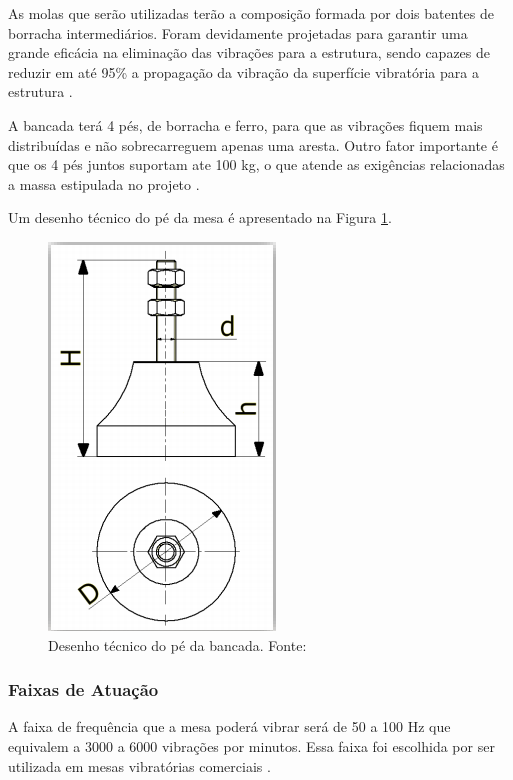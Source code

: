   As molas que serão utilizadas terão a composição formada por dois batentes de borracha intermediários. Foram devidamente projetadas para garantir uma grande eficácia na eliminação das vibrações para a estrutura, sendo capazes de reduzir em até 95\% a propagação da vibração da superfície vibratória para a estrutura \cite{mola_catalogo}.

    A bancada terá 4 pés, de borracha e ferro, para que as vibrações fiquem mais distribuídas e não sobrecarreguem apenas uma aresta. Outro fator importante é que os 4 pés juntos suportam ate 100 kg, o que atende as exigências relacionadas a massa estipulada no projeto \cite{ferramentas_kennedy}.

    Um desenho técnico do pé da mesa é apresentado na Figura \ref{fig:pe_bancada}.

    \begin{figure}[!ht]
      \centering
      \includegraphics[scale=0.5]{figuras/amortecedor.png}
      \caption{Desenho técnico do pé da bancada. Fonte: \cite{mola_catalogo}}
      \label{fig:pe_bancada}
      \end{figure}


\subsubsection*{\textbf{Faixas de Atuação}}
A faixa de frequência que a mesa poderá vibrar será de 50 a 100 Hz que equivalem a 3000 a 6000 vibrações por minutos. Essa faixa foi escolhida por ser utilizada em mesas vibratórias comerciais \cite{ricardo_jose}.

